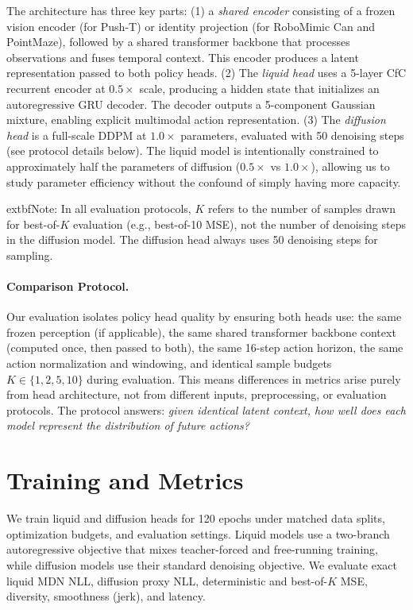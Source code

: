 \documentclass{article}
\begin{document}
The architecture has three key parts: (1) a \emph{shared encoder} consisting of a frozen vision encoder (for Push-T) or identity projection (for RoboMimic Can and PointMaze), followed by a shared transformer backbone that processes observations and fuses temporal context. This encoder produces a latent representation passed to both policy heads. (2) The \emph{liquid head} uses a 5-layer CfC recurrent encoder at $0.5\times$ scale, producing a hidden state that initializes an autoregressive GRU decoder. The decoder outputs a 5-component Gaussian mixture, enabling explicit multimodal action representation. (3) The \emph{diffusion head} is a full-scale DDPM at $1.0\times$ parameters, evaluated with 50 denoising steps (see protocol details below). The liquid model is intentionally constrained to approximately half the parameters of diffusion ($0.5\times$ vs $1.0\times$), allowing us to study parameter efficiency without the confound of simply having more capacity.

	extbf{Note:} In all evaluation protocols, $K$ refers to the number of samples drawn for best-of-$K$ evaluation (e.g., best-of-10 MSE), not the number of denoising steps in the diffusion model. The diffusion head always uses 50 denoising steps for sampling.

\paragraph{Comparison Protocol.}
Our evaluation isolates policy head quality by ensuring both heads use: the same frozen perception (if applicable), the same shared transformer backbone context (computed once, then passed to both), the same 16-step action horizon, the same action normalization and windowing, and identical sample budgets $K \in \{1, 2, 5, 10\}$ during evaluation. This means differences in metrics arise purely from head architecture, not from different inputs, preprocessing, or evaluation protocols. The protocol answers: \emph{given identical latent context, how well does each model represent the distribution of future actions?}

\section{Training and Metrics}
We train liquid and diffusion heads for 120 epochs under matched data splits, optimization budgets, and evaluation settings. Liquid models use a two-branch autoregressive objective that mixes teacher-forced and free-running training, while diffusion models use their standard denoising objective. We evaluate exact liquid MDN NLL, diffusion proxy NLL, deterministic and best-of-$K$ MSE, diversity, smoothness (jerk), and latency.
\end{document}
